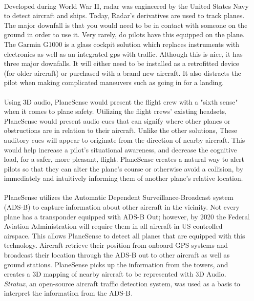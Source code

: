 \paragraph{}
Developed during World War II, radar was engineered by the United States Navy to detect aircraft and ships. Today, Radar's derivatives are used to track planes. The major downfall is that you would need to be in contact with someone on the ground in order to use it. Very rarely, do pilots have this equipped on the plane. The Garmin G1000 is a  glass cockpit solution which replaces instruments with electronics as well as an integrated gps with traffic. Although this is nice, it has three major downfalls. It will either need to be installed as a retrofitted device (for older aircraft) or purchased with a brand new aircraft. It also distracts the pilot when making complicated maneuvers such as going in for a landing.  

\paragraph{}


Using 3D audio, PlaneSense would present the flight crew with a "sixth sense" when it comes to plane safety.  Utilizing the flight crews' existing headsets, PlaneSense would present audio cues that can signify where other planes or obstructions are in relation to their aircraft. Unlike the other solutions, These auditory cues will appear to originate from the direction of nearby aircraft.  This would help increase a pilot's situational awareness, and decrease the cognitive load, for a safer, more pleasant, flight.  PlaneSense creates a natural way to alert pilots so that they can alter the plane's course or otherwise avoid a collision, by immediately and intuitively informing them of another plane's relative location. 


\paragraph{}
PlaneSense utilizes the  Automatic Dependent Surveillance-Broadcast system (ADS-B) to capture information about other aircraft in the vicinity.  Not every plane has a transponder equipped with ADS-B Out; however, by 2020 the Federal Aviation Administration will require them in all aircraft in US controlled airspace. This allows PlaneSense to detect all planes that are equipped with this technology.  Aircraft retrieve their position from onboard GPS systems and broadcast their location through the ADS-B out to other aircraft as well as ground stations. PlaneSense picks up the information from the towers, and creates a 3D mapping of nearby aircraft to be represented with 3D Audio.  \textit{Stratux}, an open-source aircraft traffic detection system, was used as a basis to interpret the information from the ADS-B.


